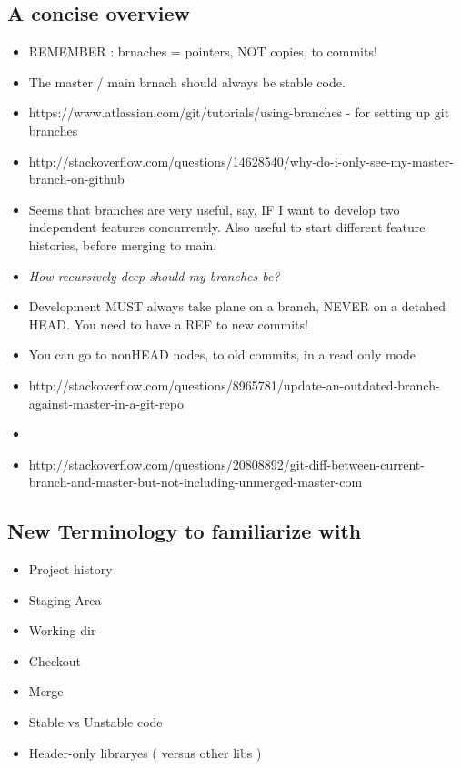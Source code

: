 \documentclass{article}
\begin{document}
\subsection{A concise overview}
\begin{itemize}
	\item REMEMBER : brnaches = pointers, NOT copies, to commits!
	\item The master / main brnach should always be stable code.
	\item https://www.atlassian.com/git/tutorials/using-branches - for setting up git branches
	\item http://stackoverflow.com/questions/14628540/why-do-i-only-see-my-master-branch-on-github
	\item Seems that branches are very useful, say, IF I want to develop two independent features concurrently. Also useful to start different feature histories, before merging to main.
	\item \textit{How recursively deep should my branches be?} 
	\item Development MUST always take plane on a branch, NEVER on a detahed HEAD. You need to have a REF to new commits! 
	\item You can go to nonHEAD nodes, to old commits, in a read only mode


	\item http://stackoverflow.com/questions/8965781/update-an-outdated-branch-against-master-in-a-git-repo 
	\item {}
	\item http://stackoverflow.com/questions/20808892/git-diff-between-current-branch-and-master-but-not-including-unmerged-master-com
\end{itemize}

\subsection{New Terminology to familiarize with}
\begin{itemize}
	\item Project history
	\item Staging Area
	\item Working dir
	\item Checkout
	\item Merge
	\item Stable vs Unstable code
	\item Header-only libraryes ( versus other libs ) 
\end{itemize}
\end{document}

